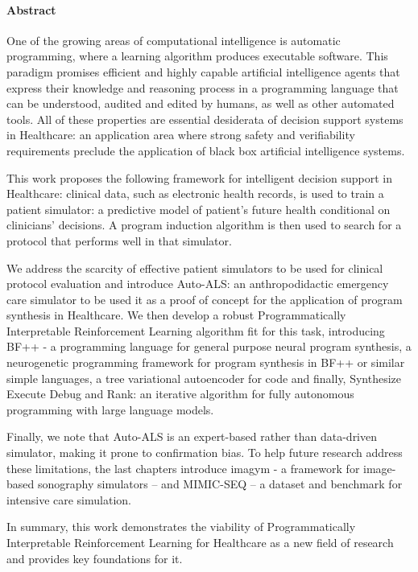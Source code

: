 \paragraph{Abstract}

One of the growing areas of computational intelligence is automatic programming, where a learning algorithm produces executable software. This paradigm promises efficient and highly capable artificial intelligence agents that express their knowledge and reasoning process in a programming language that can be understood, audited and edited by humans, as well as other automated tools. All of these properties are essential desiderata of decision support systems in Healthcare: an application area where strong safety and verifiability requirements preclude the application of black box artificial intelligence systems.

This work proposes the following framework for intelligent decision support in Healthcare: clinical data, such as electronic health records, is used to train a patient simulator: a predictive model of patient’s future health conditional on clinicians’ decisions. A program induction algorithm is then used to search for a protocol that performs well in that simulator.

We address the scarcity of effective patient simulators to be used for clinical protocol evaluation and introduce Auto-ALS: an anthropodidactic emergency care simulator to be used it as a proof of concept for the application of program synthesis in Healthcare.
We then develop a robust Programmatically Interpretable Reinforcement Learning algorithm fit for this task, introducing BF++ - a programming language for general purpose neural program synthesis, a neurogenetic programming framework for program synthesis in BF++ or similar simple languages, a tree variational autoencoder for code and finally, Synthesize Execute Debug and Rank: an iterative algorithm for fully autonomous programming with large language models.

Finally, we note that Auto-ALS is an expert-based rather than data-driven simulator, making it prone to confirmation bias.   
To help future research address these limitations, the last chapters introduce imagym - a framework for image-based sonography simulators – and MIMIC-SEQ – a dataset and benchmark for intensive care simulation. 

In summary, this work demonstrates the viability of Programmatically Interpretable Reinforcement Learning for Healthcare as a new field of research and provides key foundations for it.